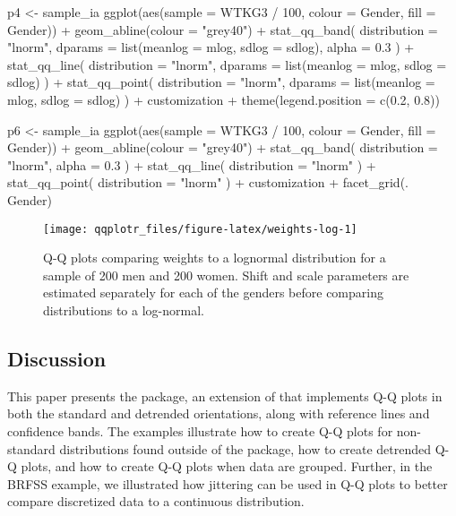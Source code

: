 \begin{Schunk}
\begin{Sinput}
p4 <- sample_ia %>% 
  ggplot(aes(sample = WTKG3 / 100, colour = Gender, fill = Gender)) +
  geom_abline(colour = "grey40") +
  stat_qq_band(
    distribution = "lnorm",
    dparams = list(meanlog = mlog, sdlog = sdlog),
    alpha = 0.3
  ) +
  stat_qq_line(
    distribution = "lnorm",
    dparams = list(meanlog = mlog, sdlog = sdlog)
  ) +
  stat_qq_point(
    distribution = "lnorm",
    dparams = list(meanlog = mlog, sdlog = sdlog)
  ) +
  customization +
  theme(legend.position = c(0.2, 0.8)) 

p6 <- sample_ia %>% 
  ggplot(aes(sample = WTKG3 / 100, colour = Gender, fill = Gender)) +
  geom_abline(colour = "grey40") +
  stat_qq_band(
    distribution = "lnorm", 
    alpha = 0.3
  ) +
  stat_qq_line(
    distribution = "lnorm"
  ) +
  stat_qq_point(
    distribution = "lnorm"
  ) +
  customization + facet_grid(. ~ Gender)
\end{Sinput}
\begin{figure}

{\centering \texttt{[image: qqplotr\_files/figure-latex/weights-log-1]} 

}

\caption[Q-Q plots comparing weights to a lognormal distribution for a sample of 200 men and 200 women]{Q-Q plots comparing weights to a lognormal distribution for a sample of 200 men and 200 women. Shift and scale parameters are estimated separately for each of the genders before comparing distributions to a log-normal.}\label{fig:weights-log}
\end{figure}
\end{Schunk}

\subsection{Discussion}\label{discussion}

This paper presents the  package, an extension of
 that implements Q-Q plots in both the standard and
detrended orientations, along with reference lines and confidence bands.
The examples illustrate how to create Q-Q plots for non-standard
distributions found outside of the  package, how to create
detrended Q-Q plots, and how to create Q-Q plots when data are grouped.
Further, in the BRFSS example, we illustrated how jittering can be used
in Q-Q plots to better compare discretized data to a continuous
distribution.

